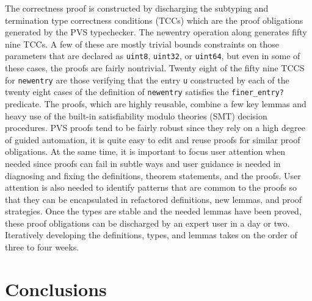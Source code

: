 \documentclass[sigplan,10pt,anonymous,review]{acmart}\settopmatter{printfolios=true,printccs=false,printacmref=false}
\begin{document}
\begin{CCSXML}
The correctness proof is constructed by discharging the subtyping and
termination type correctness conditions (TCCs) which are the proof
obligations generated by the PVS typechecker.  The newentry operation
along generates fifty nine TCCs.  A few of these are mostly trivial
bounds constraints on those parameters that are declared as
\texttt{uint8}, \texttt{uint32}, or \texttt{uint64}, but even in some
of these cases, the proofs are fairly nontrivial. Twenty eight of the
fifty nine TCCS for \texttt{newentry} are those verifying that the
entry \texttt{u} constructed by each of the twenty eight cases of the
definition of \texttt{newentry} satisfies the \texttt{finer\_entry?}
predicate.  The proofs, which are highly reusable, combine 
a few key lemmas and heavy use of the built-in satisfiability modulo
theories (SMT) decision procedures.  PVS proofs tend to be fairly
robust since they rely on a high degree of guided automation, it is
quite easy to edit and reuse proofs for similar proof obligations.  At the same
time, it is important to focus user attention when needed since
proofs can fail in subtle ways and user guidance is needed in
diagnosing and fixing the definitions, theorem statements, and the
proofs.  User attention is also needed to identify patterns that are
common to the proofs so that they can be encapsulated in refactored
definitions, new lemmas, and proof strategies.  Once the types are stable
and the needed lemmas have been proved, these proof
obligations can be discharged by an expert user in a day or two.
Iteratively developing the definitions, types, and lemmas takes on the
order of three to four weeks.  


\section{Conclusions}


\end{CCSXML}
\end{document}
